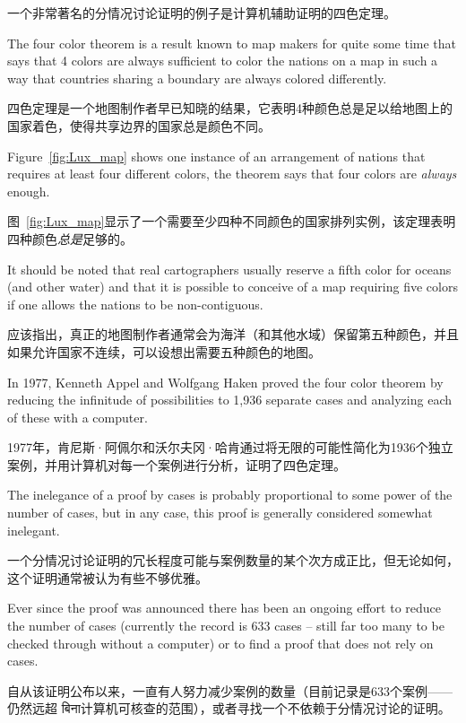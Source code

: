 一个非常著名的分情况讨论证明的例子是计算机辅助证明的四色定理。

The four color theorem is a result known to
map makers for quite some time that says that 4 colors are always sufficient
to color the nations on a map in such a way that countries sharing a boundary
are always colored differently.

四色定理是一个地图制作者早已知晓的结果，它表明4种颜色总是足以给地图上的国家着色，使得共享边界的国家总是颜色不同。

Figure~\ref{fig:Lux_map} shows one instance
of an arrangement of nations that requires at least four different colors, 
the theorem says that four colors are \emph{always} enough.

图~\ref{fig:Lux_map}显示了一个需要至少四种不同颜色的国家排列实例，该定理表明四种颜色\emph{总是}足够的。

It should be noted
that real cartographers usually reserve a fifth color for oceans (and other 
water) and that it is possible to conceive of a map requiring five colors if 
one allows the nations to be non-contiguous.

应该指出，真正的地图制作者通常会为海洋（和其他水域）保留第五种颜色，并且如果允许国家不连续，可以设想出需要五种颜色的地图。

In 1977, 
 Kenneth Appel and 
Wolfgang Haken proved the four color
theorem by reducing the infinitude of possibilities to 
1,936 separate cases and analyzing each of these with a computer.

1977年，肯尼斯·阿佩尔和沃尔夫冈·哈肯通过将无限的可能性简化为1936个独立案例，并用计算机对每一个案例进行分析，证明了四色定理。

The inelegance of a proof by cases is probably proportional to some power of
the number of cases, but in any case, this proof is generally considered 
somewhat inelegant.

一个分情况讨论证明的冗长程度可能与案例数量的某个次方成正比，但无论如何，这个证明通常被认为有些不够优雅。

Ever since the proof was announced there has been an
ongoing effort to reduce the number of cases (currently the record is 633
cases -- still far too many to be checked through without a computer) or to
find a proof that does not rely on cases.

自从该证明公布以来，一直有人努力减少案例的数量（目前记录是633个案例——仍然远超 बिना计算机可核查的范围），或者寻找一个不依赖于分情况讨论的证明。

